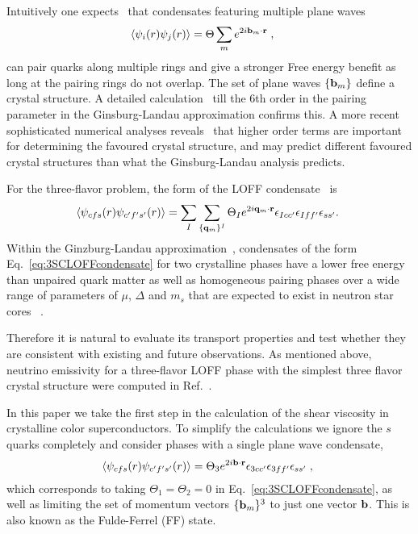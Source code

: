 \documentclass[10pt, aps, prd, superscriptaddress, nofootinbib, 
               amsmath, amssymb, twocolumn,
               preprintnumbers, showpacs,
               raggedbottom,
               floatfix]{revtex4-1}
\newcommand{\bfr}{{\bf{r}}}
\newcommand{\bfq}{{\bf{q}}}
\newcommand{\bfb}{{\bf{b}}}
\begin{document}
Intuitively one expects~\cite{Bowers:2002xr} that condensates featuring
multiple plane waves 
\begin{equation}
\begin{split}
\langle\psi_{i}(r)\psi_{j}(r)\rangle &=  \Theta \sum_{m}
e^{2i\bfb_m\cdot\bfr}\;,~\label{eq:LOcondensate}
\end{split}
\end{equation}
can pair quarks along multiple rings and give a stronger
Free energy benefit as long at the pairing rings do not overlap. The
set of plane waves $\{\bfb_m\}$ define a crystal structure. A detailed
calculation~\cite{Bowers:2002xr} till the $6$th order in the pairing parameter in
the Ginsburg-Landau approximation confirms this. A more recent sophisticated
numerical analyses reveals~\cite{Cao:2015rea} that higher order terms are 
important for determining the favoured crystal structure, and may predict
different favoured crystal structures than what the Ginsburg-Landau analysis
predicts.

For the three-flavor problem, the form of the LOFF
condensate~\cite{Casalbuoni:2005zp,Mannarelli:2006,Rajagopal:2006ig} is
\begin{equation}
\begin{split}
\langle\psi_{cfs}(r)\psi_{c'f's'}(r)\rangle = 
\sum_I \sum_{\{\bfq_m\}^I} \Theta_I
e^{2i\bfq_m\cdot\bfr} 
\epsilon_{Icc'}\epsilon_{Iff'}\epsilon_{ss'}.~\label{eq:3SCLOFFcondensate}
\end{split}
\end{equation}
Within the Ginzburg-Landau approximation~\cite{Rajagopal:2006ig},
condensates of the form Eq.~\ref{eq:3SCLOFFcondensate}
for two crystalline phases have a lower free energy than unpaired quark 
matter as well as homogeneous pairing phases over a wide range of parameters of
$\mu$, $\Delta$ and $m_s$ that are expected to exist in neutron star cores
~\cite{Ippolito:2007uz}.

Therefore it is natural to evaluate its transport properties and test whether
they are consistent with existing and future observations. As mentioned above,
neutrino emissivity for a three-flavor LOFF phase with the simplest three
flavor crystal structure were computed in Ref.~\cite{Anglani:2006br}. 

In this paper we take the first step in the calculation of the shear viscosity
in crystalline color superconductors. To simplify the calculations we ignore
the $s$ quarks completely and consider phases with a single plane wave
condensate,
\begin{equation}
\begin{split}
\langle\psi_{cfs}(r)\psi_{c'f's'}(r)\rangle = \Theta_3 e^{2i\bfb\cdot\bfr}  
\epsilon_{3cc'}\epsilon_{3ff'}\epsilon_{ss'}\;,~\label{eq:2SCFFcondensate}
\end{split}
\end{equation}
which corresponds to taking $\Theta_1=\Theta_2=0$ in
Eq.~\ref{eq:3SCLOFFcondensate}, as well as
limiting the set of momentum vectors $\{\bfb_{m}\}^3$ to just one vector $\bfb$. This 
is also known as the Fulde-Ferrel (FF) state.  
\end{document}
